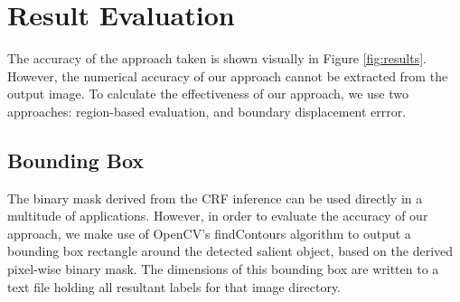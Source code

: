\documentclass[10pt,twocolumn,letterpaper]{article}
\begin{document}
\section{Result Evaluation}
The accuracy of the approach taken is shown visually in Figure \ref{fig:results}.  However, the numerical accuracy of our approach cannot be extracted from the output image.  To calculate the effectiveness of our approach, we use two approaches: region-based evaluation, and boundary displacement errror.


\subsection{Bounding Box}
The binary mask derived from the CRF inference can be used directly in a multitude of applications. However, in order to evaluate the accuracy of our approach, we make use of OpenCV's findContours algorithm \cite{topological} to output a bounding box rectangle around the detected salient object, based on the derived pixel-wise binary mask. The dimensions of this bounding box are written to a text file holding all resultant labels for that image directory.
\end{document}
